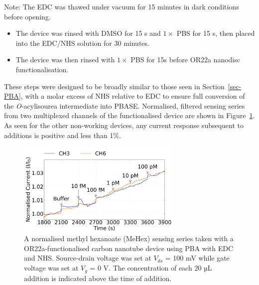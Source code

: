 \documentclass[
  a4paper,
]{scrbook}
\begin{document}
Note: The EDC was thawed under vacuum for 15 minutes in dark conditions
before opening.

\begin{itemize}
\item
  The device was rinsed with DMSO for 15 s and \(1 \times\) PBS for 15
  s, then placed into the EDC/NHS solution for 30 minutes.
\item
  The device was then rinsed with \(1 \times\) PBS for 15s before OR22a
  nanodisc functionalisation.
\end{itemize}

These steps were designed to be broadly similar to those seen in
Section~\ref{sec-PBA}, with a molar excess of NHS relative to EDC to
ensure full conversion of the \emph{O}-acylisourea intermediate into
PBASE. Normalised, filtered sensing series from two multiplexed channels
of the functionalised device are shown in
Figure~\ref{fig-EDCNHS-sensing}. As seen for the other non-working
devices, any current response subsequent to additions is positive and
less than 1\%.

\begin{figure}

{\centering \includegraphics[width=0.7\textwidth,height=\textheight]{figures/ch7/NTQ25D3_OR22a_sample_220218_EDCNHS.png}

}

\caption[A normalised methyl hexanoate (MeHex) sensing series taken with
a OR22a-functionalised carbon nanotube device using PBA with EDC and
NHS.]{\label{fig-EDCNHS-sensing}A normalised methyl hexanoate (MeHex)
sensing series taken with a OR22a-functionalised carbon nanotube device
using PBA with EDC and NHS. Source-drain voltage was set at \(V_{ds}\) =
100 mV while gate voltage was set at \(V_g\) = 0 V. The concentration of
each 20 µL addition is indicated above the time of addition.}

\end{figure}
\end{document}
